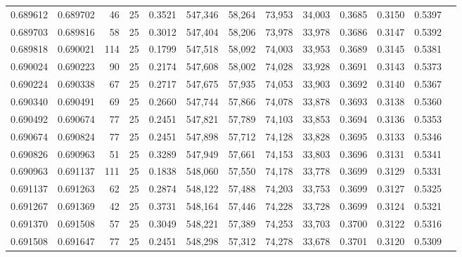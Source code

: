 \begin{tabular}{rrrrrrrrrrrrr}
0.689612 & 0.689702 &    46 &  25 &                                     0.3521 & 547,346 &  58,264 &  73,953 &  34,003 & 0.3685 & 0.3150 & 0.5397 \\
0.689703 & 0.689816 &    58 &  25 &                                     0.3012 & 547,404 &  58,206 &  73,978 &  33,978 & 0.3686 & 0.3147 & 0.5392 \\
0.689818 & 0.690021 &   114 &  25 &                                     0.1799 & 547,518 &  58,092 &  74,003 &  33,953 & 0.3689 & 0.3145 & 0.5381 \\
0.690024 & 0.690223 &    90 &  25 &                                     0.2174 & 547,608 &  58,002 &  74,028 &  33,928 & 0.3691 & 0.3143 & 0.5373 \\
0.690224 & 0.690338 &    67 &  25 &                                     0.2717 & 547,675 &  57,935 &  74,053 &  33,903 & 0.3692 & 0.3140 & 0.5367 \\
0.690340 & 0.690491 &    69 &  25 &                                     0.2660 & 547,744 &  57,866 &  74,078 &  33,878 & 0.3693 & 0.3138 & 0.5360 \\
0.690492 & 0.690674 &    77 &  25 &                                     0.2451 & 547,821 &  57,789 &  74,103 &  33,853 & 0.3694 & 0.3136 & 0.5353 \\
0.690674 & 0.690824 &    77 &  25 &                                     0.2451 & 547,898 &  57,712 &  74,128 &  33,828 & 0.3695 & 0.3133 & 0.5346 \\
0.690826 & 0.690963 &    51 &  25 &                                     0.3289 & 547,949 &  57,661 &  74,153 &  33,803 & 0.3696 & 0.3131 & 0.5341 \\
0.690963 & 0.691137 &   111 &  25 &                                     0.1838 & 548,060 &  57,550 &  74,178 &  33,778 & 0.3699 & 0.3129 & 0.5331 \\
0.691137 & 0.691263 &    62 &  25 &                                     0.2874 & 548,122 &  57,488 &  74,203 &  33,753 & 0.3699 & 0.3127 & 0.5325 \\
0.691267 & 0.691369 &    42 &  25 &                                     0.3731 & 548,164 &  57,446 &  74,228 &  33,728 & 0.3699 & 0.3124 & 0.5321 \\
0.691370 & 0.691508 &    57 &  25 &                                     0.3049 & 548,221 &  57,389 &  74,253 &  33,703 & 0.3700 & 0.3122 & 0.5316 \\
0.691508 & 0.691647 &    77 &  25 &                                     0.2451 & 548,298 &  57,312 &  74,278 &  33,678 & 0.3701 & 0.3120 & 0.5309 \\

\end{tabular}
